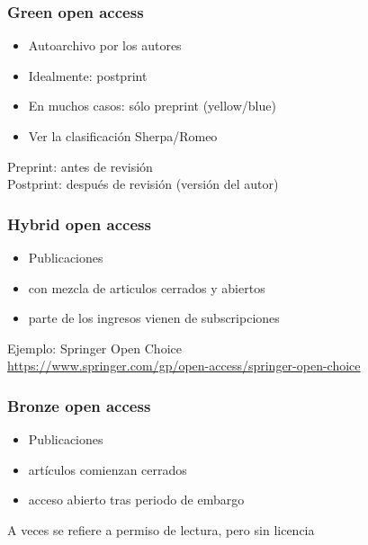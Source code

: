 \documentclass[17pt,aspectratio=169]{beamer}
\begin{document}
\begin{frame}
\frametitle{Green open access}

\begin{itemize}
\item Autoarchivo por los autores
\item Idealmente: postprint
\item En muchos casos: sólo preprint (yellow/blue)
\item Ver la clasificación Sherpa/Romeo
\end{itemize}

\vspace{.5cm}

Preprint: antes de revisión \\
Postprint: después de revisión (versión del autor) \\
\end{frame}

\begin{frame}
\frametitle{Hybrid open access}

\begin{itemize}
\item Publicaciones
\item con mezcla de articulos cerrados y abiertos
\item parte de los ingresos vienen de subscripciones
\end{itemize}

\begin{flushright}
  Ejemplo: Springer Open Choice \\
  {\small \url{https://www.springer.com/gp/open-access/springer-open-choice}} \\
\end{flushright}
\end{frame}

\begin{frame}
\frametitle{Bronze open access}

\begin{itemize}
\item Publicaciones
\item artículos comienzan cerrados
\item acceso abierto tras periodo de embargo
\end{itemize}

A veces se refiere a permiso de lectura, pero sin licencia

\end{frame}
\end{document}
